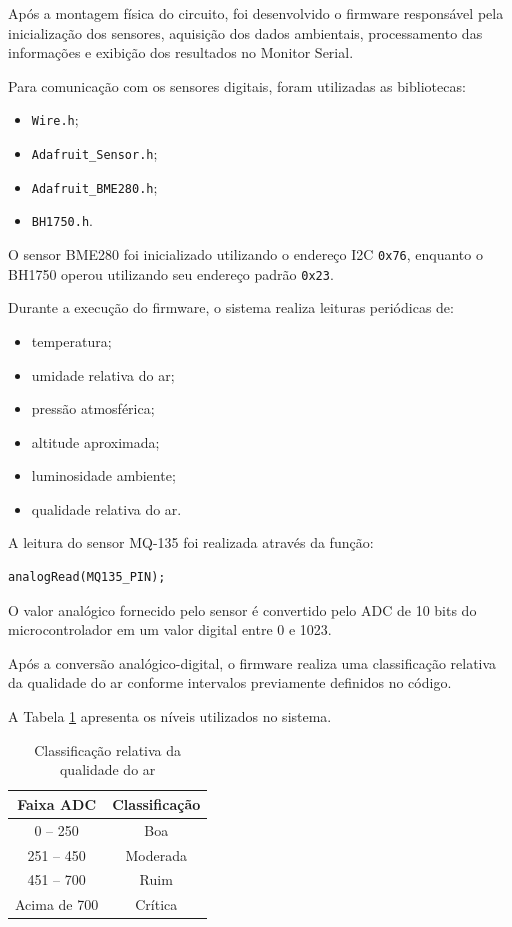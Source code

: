\documentclass[a4paper,12pt]{article}
\begin{document}
Após a montagem física do circuito, foi desenvolvido o firmware responsável pela inicialização dos sensores, aquisição dos dados ambientais, processamento das informações e exibição dos resultados no Monitor Serial.

Para comunicação com os sensores digitais, foram utilizadas as bibliotecas:
\begin{itemize}
    \item \texttt{Wire.h};
    \item \texttt{Adafruit\_Sensor.h};
    \item \texttt{Adafruit\_BME280.h};
    \item \texttt{BH1750.h}.
\end{itemize}

O sensor BME280 foi inicializado utilizando o endereço I2C \texttt{0x76}, enquanto o BH1750 operou utilizando seu endereço padrão \texttt{0x23}.

Durante a execução do firmware, o sistema realiza leituras periódicas de:
\begin{itemize}
    \item temperatura;
    \item umidade relativa do ar;
    \item pressão atmosférica;
    \item altitude aproximada;
    \item luminosidade ambiente;
    \item qualidade relativa do ar.
\end{itemize}

A leitura do sensor MQ-135 foi realizada através da função:

\begin{verbatim}
analogRead(MQ135_PIN);
\end{verbatim}

O valor analógico fornecido pelo sensor é convertido pelo ADC de 10 bits do microcontrolador em um valor digital entre 0 e 1023.

Após a conversão analógico-digital, o firmware realiza uma classificação relativa da qualidade do ar conforme intervalos previamente definidos no código.

A Tabela \ref{tab:qualidade_ar} apresenta os níveis utilizados no sistema.

\begin{table}[H]
\centering
\caption{Classificação relativa da qualidade do ar}
\label{tab:qualidade_ar}
\begin{tabular}{|c|c|}
\hline
\textbf{Faixa ADC} & \textbf{Classificação} \\ \hline
0 -- 250 & Boa \\ \hline
251 -- 450 & Moderada \\ \hline
451 -- 700 & Ruim \\ \hline
Acima de 700 & Crítica \\ \hline
\end{tabular}
\end{table}
\end{document}
